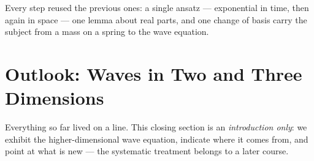 \documentclass[11pt]{article}
\theoremstyle{plain}
\theoremstyle{definition}
\theoremstyle{remark}
\begin{document}
Every step reused the previous ones: a single ansatz --- exponential in
time, then again in space --- one lemma about real parts, and one change of
basis carry the subject from a mass on a spring to the wave equation.

\section{Outlook: Waves in Two and Three Dimensions}
\label{sec:outlook}

Everything so far lived on a line. This closing section is an
\emph{introduction only}: we exhibit the higher-dimensional wave equation,
indicate where it comes from, and point at what is new --- the systematic
treatment belongs to a later course.
\end{document}
